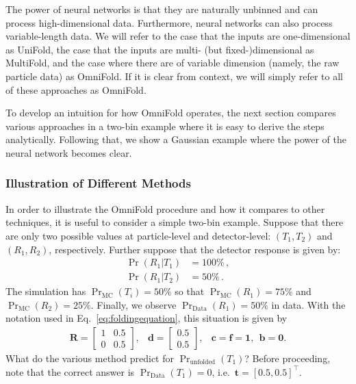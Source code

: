 The power of neural networks is that they are naturally unbinned and can process high-dimensional data.  Furthermore, neural networks can also process variable-length data.  We will refer to the case that the inputs are one-dimensional as UniFold, the case that the inputs are multi- (but fixed-)dimensional as MultiFold, and the case where there are of variable dimension (namely, the raw particle data) as OmniFold.  If it is clear from context, we will simply refer to all of these approaches as OmniFold.

To develop an intuition for how OmniFold operates, the next section compares various approaches in a two-bin example where it is easy to derive the steps analytically.  Following that, we show a Gaussian example where the power of the neural network becomes clear.

\subsubsection{Illustration of Different Methods}

In order to illustrate the OmniFold procedure and how it compares to other techniques, it is useful to consider a simple two-bin example.  Suppose that there are only two possible values at particle-level and detector-level: $(T_1,T_2)$ and $(R_1,R_2)$, respectively.  Further suppose that the detector response is given by:
%
\begin{align}
\Pr(R_1|T_1)&=100\%\,,\\
\Pr(R_1|T_2)&=50\%\,.
\end{align}
%
The simulation has $\Pr_\text{MC}(T_i)=50\%$ so that $\Pr_\text{MC}(R_1)=75\%$ and $\Pr_\text{MC}(R_2)=25\%$.   Finally, we observe $\Pr_\text{Data}(R_1)=50\%$ in data.
With the notation used in Eq.~\ref{eq:foldingequation}, this situation is given by
%
\begin{eqnarray}
	\mathbf{R} = \begin{bmatrix} 1 & 0.5\\ 0 & 0.5\end{bmatrix}, & \mathbf{d} = \begin{bmatrix} 0.5\\ 0.5\end{bmatrix}, & \mathbf{c}=\mathbf{f}=\mathbf{1},~~\mathbf{b}=\mathbf{0}.
\end{eqnarray}
%
What do the various method predict for $\Pr_\text{unfolded}(T_1)$?   Before proceeding, note that the correct answer is $\Pr_\text{Data}(T_1)=0$, i.e.\ $\mathbf{t}=[0.5,0.5]^\intercal$.

